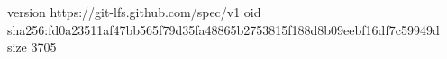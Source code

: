 version https://git-lfs.github.com/spec/v1
oid sha256:fd0a23511af47bb565f79d35fa48865b2753815f188d8b09eebf16df7c59949d
size 3705
